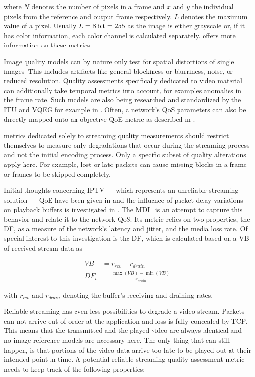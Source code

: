 where $N$ denotes the number of pixels in a frame and $x$ and $y$ the individual pixels from the reference and output frame respectively. $L$ denotes the maximum value of a pixel. Usually $L = \SI{8}{\bit} = 255$ as the image is either grayscale or, if it has color information, each color channel is calculated separately. \cite{objective-vqa} offers more information on these metrics.

Image quality models can by nature only test for spatial distortions of single images. This includes artifacts like general blockiness or blurriness, noise, or reduced resolution. Quality assessments specifically dedicated to video material can additionally take temporal metrics into account, for examples anomalies in the frame rate. Such models are also being researched and standardized by the \gls{ITU} and \gls{VQEG} for example in \cite{ituJ144, ituJ246, ituJ247}. Often, a network's \gls{QoS} parameters can also be directly mapped onto an objective \gls{QoE} metric as described in \cite{5430142}.

metrics dedicated solely to streaming quality measurements should restrict themselves to measure only degradations that occur during the streaming process and not the initial encoding process. Only a specific subset of quality alterations apply here. For example, lost or late packets can cause missing blocks in a frame or frames to be skipped completely. 

Initial thoughts concerning \gls{IPTV} --- which represents an unreliable streaming solution --- \gls{QoE} have been given in \cite{ituG1080} and the influence of packet delay variations on playback buffers is investigated in \cite{rfc3393}. The \gls{MDI}~\cite{rfc4445} is an attempt to capture this behavior and relate it to the network \gls{QoS}. Its metric relies on two properties, the \gls{DF}, as a measure of the network's latency and jitter, and the media loss rate. Of special interest to this investigation is the \gls{DF}, which is calculated based on a \gls{VB} of received stream data as


\begin{align}
	VB &= r_{rcv} - r_{drain} \\
	DF_i &= \frac{\max(VB) - \min(VB)}{r_{drain}}
\end{align}

with $r_{rcv}$ and $r_{drain}$ denoting the buffer's receiving and draining rates.

Reliable streaming has even less possibilities to degrade a video stream. Packets can not arrive out of order at the application and loss is fully concealed by \gls{TCP}. This means that the transmitted and the played video are always identical and no image reference models are necessary here. The only thing that can still happen, is that portions of the video data arrive too late to be played out at their intended point in time. A potential reliable streaming quality assessment metric needs to keep track of the following properties:

